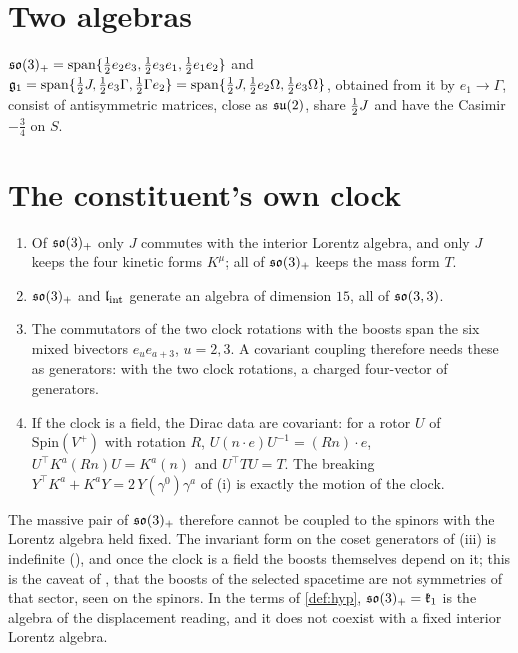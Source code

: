 \section{Two algebras}

\begin{proposition}
\label{prop:twoalg}
$\mathfrak{so}(3)_+=\mathrm{span}\{\tfrac12 e_2e_3,\tfrac12 e_3e_1,\tfrac12 e_1e_2\}$ and $\mathfrak g_1=\mathrm{span}\{\tfrac12 J,\tfrac12 e_3\Gamma,\tfrac12\Gamma e_2\}
=\mathrm{span}\{\tfrac12 J,\tfrac12 e_2\Omega,\tfrac12 e_3\Omega\}$, obtained from it by $e_1\to\Gamma$, consist of antisymmetric matrices, close as
$\mathfrak{su}(2)$, share $\tfrac12 J$ and have the Casimir $-\tfrac34$ on $S$.
\end{proposition}

\section{The constituent's own clock}

\begin{theorem}
\label{thm:ownclock}
\begin{enumerate}[label=(\roman*),leftmargin=2.2em,itemsep=1pt]
\item Of $\mathfrak{so}(3)_+$ only $J$ commutes with the interior Lorentz algebra, and only $J$ keeps the four kinetic forms $K^\mu$; all of $\mathfrak{so}(3)_+$
keeps the mass form $T$.
\item $\mathfrak{so}(3)_+$ and $\mathfrak l_{\rm int}$ generate an algebra of dimension $15$, all of $\mathfrak{so}(3,3)$.
\item The commutators of the two clock rotations with the boosts span the six mixed bivectors $e_ue_{a+3}$, $u=2,3$. A covariant coupling
therefore needs these as generators: with the two clock rotations, a charged four-vector of generators.
\item If the clock is a field, the Dirac data are covariant: for a rotor $U$ of $\mathrm{Spin}(V^+)$ with rotation $R$,
$U(n\cdot e)U^{-1}=(Rn)\cdot e$, $U^\top K^a(Rn)U=K^a(n)$ and $U^\top TU=T$. The breaking $Y^\top K^a+K^aY=2\,Y(\gamma^0)\gamma^a$ of
(i) is exactly the motion of the clock.
\end{enumerate}
\end{theorem}

The massive pair of $\mathfrak{so}(3)_+$ therefore cannot be coupled to the spinors with the Lorentz algebra held fixed. The invariant form on the coset
generators of (iii) is indefinite (), and once the clock is a field the boosts themselves depend on it; this is the caveat of
, that the boosts of the selected spacetime are not symmetries of that sector, seen on the spinors. In the terms of
\cref{def:hyp}, $\mathfrak{so}(3)_+=\mathfrak k_1$ is the algebra of the displacement reading, and it does not coexist with a fixed interior Lorentz
algebra.

